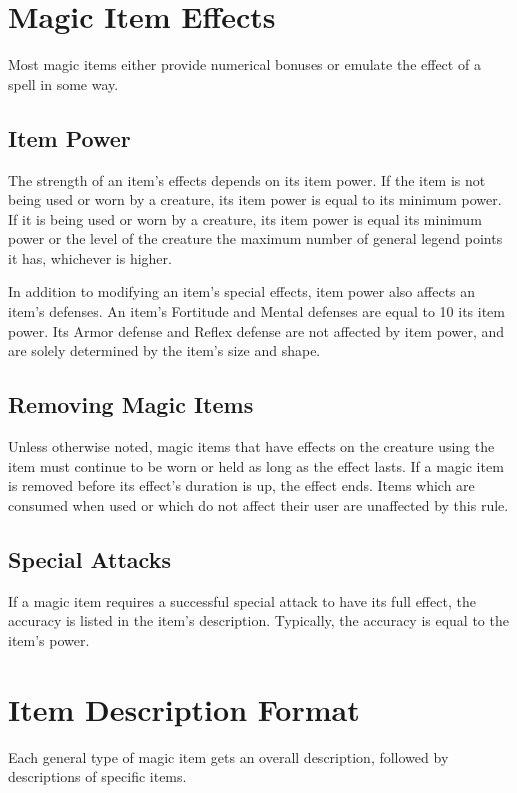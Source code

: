 \section{Magic Item Effects}
    Most magic items either provide numerical bonuses or emulate the effect of a spell in some way.

    \subsection{Item Power}\label{Item Power}
        The strength of an item's effects depends on its item power.
        If the item is not being used or worn by a creature, its item power is equal to its minimum power.
        If it is being used or worn by a creature, its item power is equal its minimum power or the level of the creature \add the maximum number of general legend points it has, whichever is higher.

        In addition to modifying an item's special effects, item power also affects an item's defenses.
        An item's Fortitude and Mental defenses are equal to 10 \add its item power.
        Its Armor defense and Reflex defense are not affected by item power, and are solely determined by the item's size and shape.

    \subsection{Removing Magic Items}
        Unless otherwise noted, magic items that have effects on the creature using the item must continue to be worn or held as long as the effect lasts.
        If a magic item is removed before its effect's duration is up, the effect ends.
        Items which are consumed when used or which do not affect their user are unaffected by this rule.

    \subsection{Special Attacks}
        If a magic item requires a successful special attack to have its full effect, the accuracy is listed in the item's description.
        Typically, the accuracy is equal to the item's power.

\section{Item Description Format}

    Each general type of magic item gets an overall description, followed by descriptions of specific items.

